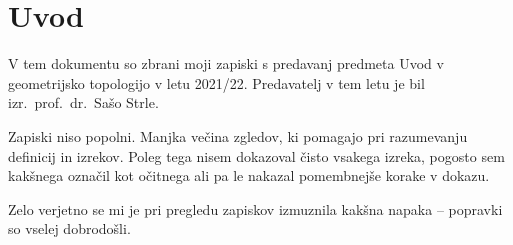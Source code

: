 \section*{Uvod}

V tem dokumentu so zbrani moji zapiski s predavanj predmeta Uvod v
geometrijsko topologijo v letu 2021/22. Predavatelj v tem letu je
bil izr.~prof.~dr.~Sašo Strle.

Zapiski niso popolni. Manjka večina zgledov, ki pomagajo pri
razumevanju definicij in izrekov. Poleg tega nisem dokazoval čisto
vsakega izreka, pogosto sem kakšnega označil kot očitnega ali pa le
nakazal pomembnejše korake v dokazu.

Zelo verjetno se mi je pri pregledu zapiskov izmuznila kakšna napaka
-- popravki so vselej dobrodošli.
